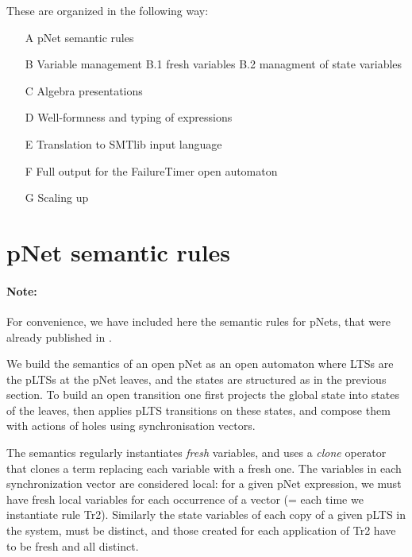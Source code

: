 \documentclass{lncs/llncs}
\begin{document}
These are organized in the following way:

\begin{enumerate}
\item[A] pNet semantic rules
\item[B] Variable management
  \subitem B.1 fresh variables
  \subitem B.2 managment of state variables
\item[C] Algebra presentations
\item[D] Well-formness and typing of expressions
\item[E] Translation to SMTlib input language
\item[F] Full output for the FailureTimer open automaton
\item[G] Scaling up
  
\end{enumerate}


\section{pNet semantic rules}
\label{appendix:semRules}

\paragraph{Note:} For convenience, we have included here the semantic rules for pNets,
that were already published in \cite{henrio:Forte2016}.

We build the semantics of an open pNet as an open automaton where
LTSs are the pLTSs at 
the pNet leaves, and the states are structured as in
the previous section. 
To build an open transition one first
 projects the global state into states of the leaves, then applies
pLTS transitions on these states, and compose them with actions of
holes using synchronisation vectors. %

The semantics   regularly instantiates \emph{fresh} variables, and uses a
\emph{clone} operator that clones a term replacing each variable with a
fresh one.
The variables in each synchronization vector are considered local:
for a given pNet expression, we must have fresh local variables for
each occurrence of a vector (= each time we instantiate rule
Tr2). Similarly the state variables of each copy of a
given pLTS in the system, must be distinct, and those created for each
application of Tr2 have to be fresh and all distinct. 
\end{document}
